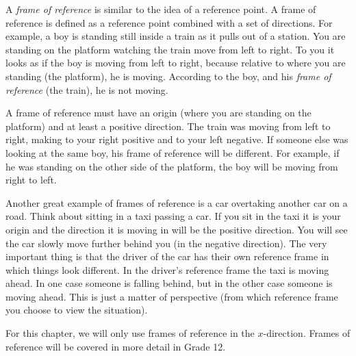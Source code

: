         \label{m38787*id62648}A \textsl{frame of reference} is similar to the idea of a reference point. A frame of reference is defined as a reference point combined with a set of directions. For example, a boy is standing still inside a train as it pulls out of a station. You are standing on the platform watching the train move from left to right. To you it looks as if the boy is moving from left to right, because relative to where you are standing (the platform), he is moving. According to the boy, and his \textsl{frame of reference} (the train), he is not moving.\par 
        \label{m38787*id62666}A frame of reference must have an origin (where you are standing on the platform) and at least a positive direction. The train was moving from left to right, making to your right positive and to your left negative. If someone else was looking at the same boy, his frame of reference will be different. For example, if he was standing on the other side of the platform, the boy will be moving from right to left.\par 
        \label{m38787*eip-271}Another great example of frames of reference is a car overtaking another car on a road. Think about sitting in a taxi passing a car. If you sit in the taxi it is your origin and the direction it is moving in will be the positive direction. You will see the car slowly move further behind you (in the negative direction). The very important thing is that the driver of the car has their own reference frame in which things look different. In the driver's reference frame the taxi is moving ahead. In one case someone is falling behind, but in the other case someone is moving ahead. This is just a matter of perspective (from which reference frame you choose to view the situation).\par \label{m38787*id62675}For this chapter, we will only use frames of reference in the \begin{math}x\end{math}-direction.
Frames of reference will be covered in more detail in Grade 12.\par 
        
    \setcounter{subfigure}{0}


